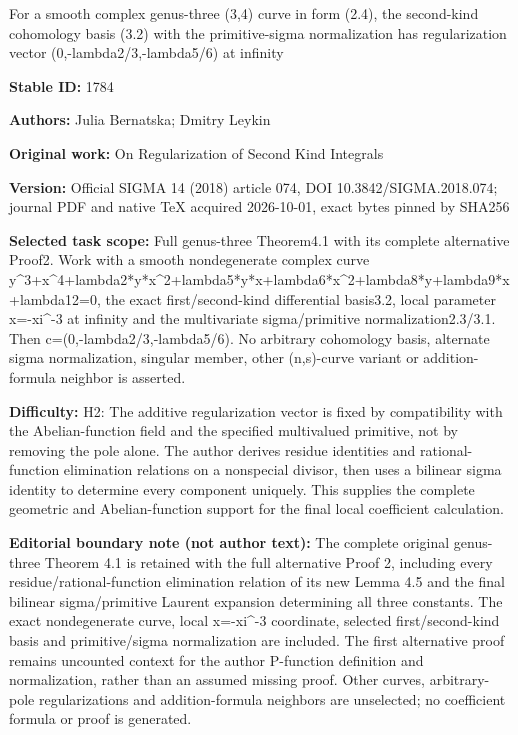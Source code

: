 \documentclass[11pt]{article}
\numberwithin{equation}{section}
\begin{document}
\begin{center}\Large For a smooth complex genus-three (3,4) curve in form (2.4), the second-kind cohomology basis (3.2) with the primitive-sigma normalization has regularization vector (0,-lambda2/3,-lambda5/6) at infinity\end{center}
\noindent\textbf{Stable ID:} 1784\par
\noindent\textbf{Authors:} Julia Bernatska; Dmitry Leykin\par
\noindent\textbf{Original work:} On Regularization of Second Kind Integrals\par
\noindent\textbf{Version:} Official SIGMA 14 (2018) article 074, DOI 10.3842/SIGMA.2018.074; journal PDF and native TeX acquired 2026-10-01, exact bytes pinned by SHA256\par
\noindent\textbf{Selected task scope:} Full genus-three Theorem4.1 with its complete alternative Proof2. Work with a smooth nondegenerate complex curve y\textasciicircum{}3+\allowbreak{}x\textasciicircum{}4+\allowbreak{}lambda2*\allowbreak{}y*\allowbreak{}x\textasciicircum{}2+\allowbreak{}lambda5*\allowbreak{}y*\allowbreak{}x+\allowbreak{}lambda6*\allowbreak{}x\textasciicircum{}2+\allowbreak{}lambda8*\allowbreak{}y+\allowbreak{}lambda9*\allowbreak{}x+\allowbreak{}lambda12=\allowbreak{}0, the exact first/second-kind differential basis3.2, local parameter x=\allowbreak{}-xi\textasciicircum{}-3 at infinity and the multivariate sigma/primitive normalization2.3/3.1. Then c=\allowbreak{}(0,-lambda2/3,-lambda5/6). No arbitrary cohomology basis, alternate sigma normalization, singular member, other (n,s)-curve variant or addition-formula neighbor is asserted.\par
\noindent\textbf{Difficulty:} H2: The additive regularization vector is fixed by compatibility with the Abelian-function field and the specified multivalued primitive, not by removing the pole alone. The author derives residue identities and rational-function elimination relations on a nonspecial divisor, then uses a bilinear sigma identity to determine every component uniquely. This supplies the complete geometric and Abelian-function support for the final local coefficient calculation.\par
\noindent\textbf{Editorial boundary note (not author text):} The complete original genus-three Theorem 4.1 is retained with the full alternative Proof 2, including every residue/rational-function elimination relation of its new Lemma 4.5 and the final bilinear sigma/primitive Laurent expansion determining all three constants. The exact nondegenerate curve, local x=\allowbreak{}-xi\textasciicircum{}-3 coordinate, selected first/second-kind basis and primitive/sigma normalization are included. The first alternative proof remains uncounted context for the author P-function definition and normalization, rather than an assumed missing proof. Other curves, arbitrary-pole regularizations and addition-formula neighbors are unselected; no coefficient formula or proof is generated.\par
\end{document}
